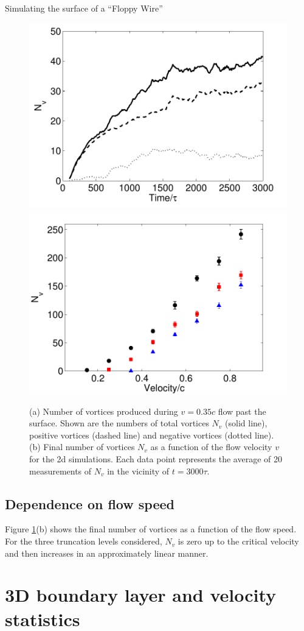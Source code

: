 \begin{chapter}{\label{cha:afm}Simulating the surface of a ``Floppy Wire''}
\begin{figure}
\centering
\includegraphics[width=0.45\linewidth]{./afm/figures/nvpn3bw}
\includegraphics[width=0.45\linewidth]{./afm/figures/nv_v}
\caption{\label{fig:nvort} (a) Number of vortices produced during $v=0.35c$ flow past the surface.  Shown are the numbers of total vortices $N_v$ (solid line), positive vortices (dashed line) and negative vortices (dotted line). (b) Final number of vortices $N_v$ as a function of the flow velocity $v$ for the 2d simulations.  Each data point represents the average of 20 measurements of $N_v$ in the vicinity of $t=3000\tau$.}
\end{figure}

\subsection{Dependence on flow speed}

Figure \ref{fig:nvort}(b) shows the final number of vortices as a function of the flow speed.  For the three truncation levels considered, $N_v$ is zero up to the critical velocity and then increases in an approximately linear manner.    

\section{\label{section:3dafmlayer} 3D boundary layer and velocity statistics}
\end{chapter}
